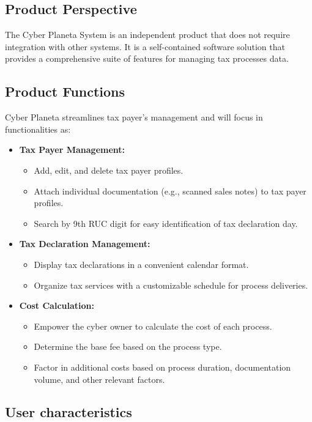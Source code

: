 \documentclass[12pt,a4paper, twosite]{article}
\begin{document}
\subsection{Product Perspective}
\label{sec:org24980a8}

The Cyber Planeta System is an independent product that does not require integration with other systems. It is a self-contained software solution that provides a comprehensive suite of features for managing tax processes data.


\subsection{Product Functions}
\label{sec:orgaf51da6}

Cyber Planeta streamlines tax payer's management and will focus in functionalities as: \begin{itemize}
\item \textbf{Tax Payer Management:}
\begin{itemize}
\item Add, edit, and delete tax payer profiles.
\item Attach individual documentation (e.g., scanned sales notes) to tax payer profiles.
\item Search by 9th RUC digit for easy identification of tax declaration day.
\end{itemize}
\item \textbf{Tax Declaration Management:}
\begin{itemize}
\item Display tax declarations in a convenient calendar format.
\item Organize tax services with a customizable schedule for process deliveries.
\end{itemize}
\item \textbf{Cost Calculation:}
\begin{itemize}
\item Empower the cyber owner to calculate the cost of each process.
\item Determine the base fee based on the process type.
\item Factor in additional costs based on process duration, documentation volume, and other relevant factors.
\end{itemize}
\end{itemize}


\subsection{User characteristics}
\label{sec:orga40b0ee}
\end{document}
